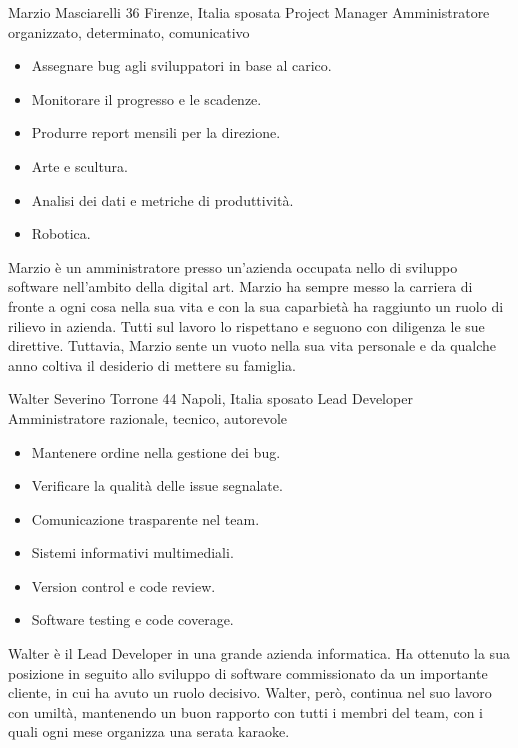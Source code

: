 \begin{personaenv}
  {Marzio Masciarelli}
  {36}
  {Firenze, Italia}
  {sposata}
  {Project Manager}
  {Amministratore}
  {organizzato, determinato, comunicativo}
  {\begin{itemize}
    \item Assegnare bug agli sviluppatori in base al carico.
    \item Monitorare il progresso e le scadenze.
    \item Produrre report mensili per la direzione.
  \end{itemize}}
  {\begin{itemize}
    \item Arte e scultura.
    \item Analisi dei dati e metriche di produttività.
    \item Robotica.
  \end{itemize}}
  {Marzio è un amministratore presso un’azienda occupata nello di sviluppo software nell’ambito della digital art. 
  Marzio ha sempre messo la carriera di fronte a ogni cosa nella sua vita e con la sua  caparbietà ha raggiunto un ruolo di 
  rilievo in azienda. Tutti sul lavoro lo rispettano e seguono con diligenza le sue direttive. Tuttavia, Marzio sente un 
  vuoto nella sua vita personale e da qualche anno coltiva il desiderio di mettere su famiglia.}
\end{personaenv}

\begin{personaenv}
  {Walter Severino Torrone}
  {44}
  {Napoli, Italia}
  {sposato}
  {Lead Developer}
  {Amministratore}
  {razionale, tecnico, autorevole}
  {\begin{itemize}
    \item Mantenere ordine nella gestione dei bug.
    \item Verificare la qualità delle issue segnalate.
    \item Comunicazione trasparente nel team.
  \end{itemize}}
  {\begin{itemize}
    \item Sistemi informativi multimediali.
    \item Version control e code review.
    \item Software testing e code coverage.
  \end{itemize}}  
  {Walter è il Lead Developer in una grande azienda informatica. Ha ottenuto la sua posizione in seguito allo sviluppo di 
  software commissionato da un importante cliente, in cui ha avuto un ruolo decisivo. Walter, però, continua nel suo lavoro 
  con umiltà, mantenendo un buon rapporto con tutti i membri del team, con i quali ogni mese organizza una serata karaoke.}
\end{personaenv}

